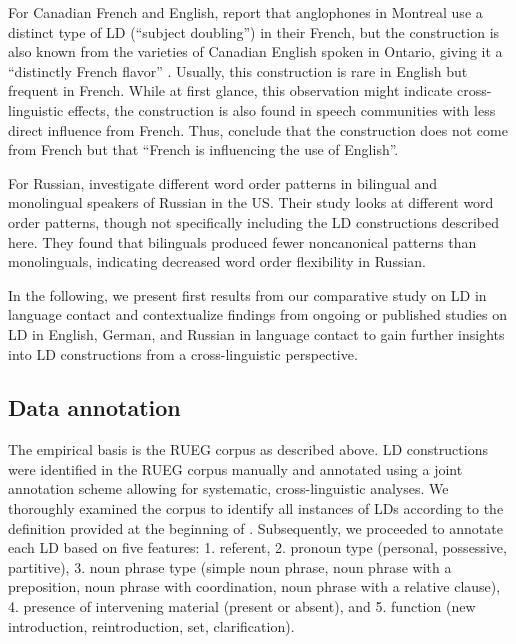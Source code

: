 \documentclass[output=paper,colorlinks,citecolor=brown]{langscibook}
\begin{document}
For Canadian French and English, \citet{nagy_second_2003} report that anglophones in Montreal use a distinct type of LD (“subject doubling”) in their French, but the construction is also known from the varieties of Canadian English spoken in Ontario, giving it a “distinctly French flavor” \citep[1]{tagliamonte_grammatical_2019}. Usually, this construction is rare in English but frequent in French. While at first glance, this observation might indicate cross-linguistic effects, the construction is also found in speech communities with less direct influence from French. Thus, \citet[13]{tagliamonte_grammatical_2019} conclude that the construction does not come from French but that “French is influencing the use of English”.

For Russian, \citet{laleko_word_2018} investigate different word order patterns in bilingual and monolingual speakers of Russian in the US. Their study looks at different word order patterns, though not specifically including the LD constructions described here. They found that bilinguals produced fewer noncanonical patterns than monolinguals, indicating decreased word order flexibility in Russian.

In the following, we present first results from our comparative study on LD in language contact and contextualize findings from ongoing or published studies on LD in English, German, and Russian in language contact to gain further insights into LD constructions from a cross-linguistic perspective.  


\subsection{Data annotation} \label{sec:bunk-data-annotation}

The empirical basis is the RUEG corpus as described above. LD constructions were identified in the RUEG corpus manually and annotated using a joint annotation scheme allowing for systematic, cross-linguistic analyses. We thoroughly examined the corpus to identify all instances of LDs according to the definition provided at the beginning of . Subsequently, we proceeded to annotate each LD based on five features: 1. referent, 2. pronoun type (personal, possessive, partitive), 3. noun phrase type (simple noun phrase, noun phrase with a preposition, noun phrase with coordination, noun phrase with a relative clause), 4. presence of intervening material (present or absent), and 5. function (new introduction, reintroduction, set, clarification).
\end{document}
